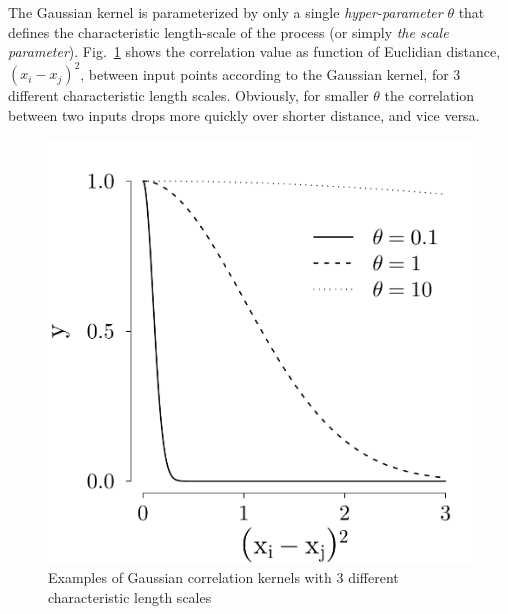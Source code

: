 The Gaussian kernel is parameterized by only a single \emph{hyper-parameter} $\theta$ that defines the characteristic length-scale of the process (or simply \emph{the scale parameter}).
Fig.~\ref{fig:plot_corrfun_gauss} shows the correlation value as function of Euclidian distance, $(x_i - x_j)^2$, between input points according to the Gaussian kernel, 
for 3 different characteristic length scales.
Obviously, for smaller $\theta$ the correlation between two inputs drops more quickly over shorter distance, and vice versa.
\begin{figure}[bth]
	\centering
	\includegraphics[scale=0.35]{../figures/chapter4/figures/plotCorrFunGauss.pdf}
	\caption[Gaussian correlation kernels with 3 different characteristic length scales]{Examples of Gaussian correlation kernels with 3 different characteristic length scales}
	\label{fig:plot_corrfun_gauss}
\end{figure}

